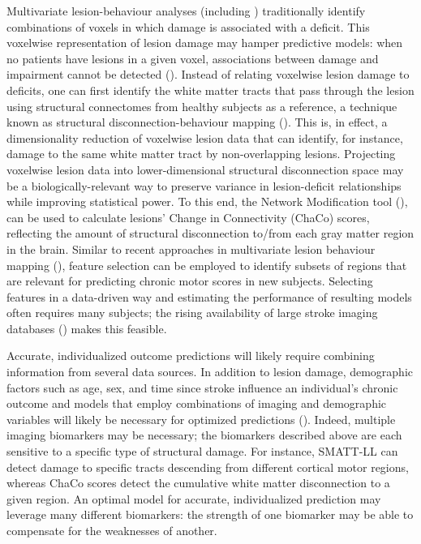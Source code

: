 \documentclass[10pt]{article}
\begin{document}
Multivariate lesion-behaviour analyses (including \cite{Bowren2022-rs}) traditionally identify combinations of voxels in which damage is associated with a deficit. This voxelwise representation of lesion damage may hamper predictive models: when no patients have lesions in a given voxel, associations between damage and impairment cannot be detected (\cite{Kimberg2007-sk, Rorden2009-ae,Sperber2020-kp,Griffis2019-cy}). Instead of relating voxelwise lesion damage to deficits, one can first identify the white matter tracts that pass through the lesion using structural connectomes from healthy subjects as a reference, a technique known as structural disconnection-behaviour mapping (\cite{Kuceyeski2013-nk, Kuceyeski2016-vj, Salvalaggio2020-pe, Griffis2019-cy, Sperber2022-oj}). This is, in effect, a dimensionality reduction of voxelwise lesion data that can identify, for instance, damage to the same white matter tract by non-overlapping lesions. Projecting voxelwise lesion data into lower-dimensional structural disconnection space may be a biologically-relevant way to preserve variance in lesion-deficit relationships while improving statistical power. To this end, the Network Modification tool (\cite{Kuceyeski2013-nk}),  can be used to calculate lesions' Change in Connectivity (ChaCo) scores, reflecting the amount of structural disconnection to/from each gray matter region in the brain.  Similar to recent approaches in multivariate lesion behaviour mapping (\cite{Kasties2021-rm}), feature selection can be employed to identify subsets of regions that are relevant for predicting chronic motor scores in new subjects. Selecting features in a data-driven way and estimating the performance of resulting models often requires many subjects; the rising availability of large stroke imaging databases (\cite{Liew2020-ps}) makes this feasible.

Accurate, individualized outcome predictions will likely require combining information from several data sources. In addition to lesion damage, demographic factors such as age, sex, and time since stroke influence an individual's chronic outcome and models that employ combinations of imaging and demographic variables will likely be necessary for optimized predictions (\cite{Bonkhoff2022-op}). Indeed, multiple imaging biomarkers may be necessary; the biomarkers described above are each sensitive to a specific type of structural damage. For instance,  SMATT-LL can detect damage to specific tracts descending from different cortical motor regions, whereas ChaCo scores detect the cumulative white matter disconnection to a given region. An optimal model for accurate, individualized prediction may leverage many different biomarkers: the strength of one biomarker may be able to compensate for the weaknesses of another. 
\end{document}
